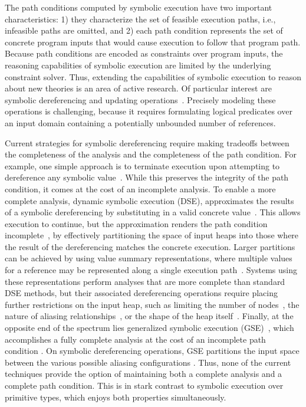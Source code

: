 The path conditions computed by symbolic execution have two important characteristics: 
1) they characterize the set of feasible execution paths, i.e., infeasible paths are omitted, 
and 2) each path condition represents the set of concrete program inputs that would cause
execution to follow that program path. Because path conditions are encoded as constraints over
program inputs, the reasoning capabilities of symbolic execution are limited by the underlying
constraint solver.
Thus, extending the capabilities of symbolic execution to reason about new theories is an area of active research. Of particular interest are symbolic dereferencing and updating operations~\cite{Chen:2013,Qu:2011}. Precisely modeling these operations is challenging, because it requires formulating logical predicates over an input domain containing a potentially unbounded number of references. 

Current strategies for symbolic dereferencing require making tradeoffs between the completeness of the analysis and the completeness of the path condition. For example, one simple approach is to terminate execution upon attempting to dereference any symbolic value~\cite{Clarke:2004}. While this preserves the integrity of the path condition, it comes at the cost of an incomplete analysis. To enable a more complete analysis, dynamic symbolic execution (DSE), approximates the results of a symbolic dereferencing by substituting in a valid concrete value~\cite{Godefroid:POPL07,Godefroid:2005,Sen:2005,Tillmann:2008}. This allows execution to continue, but the approximation renders the path condition incomplete~\cite{Chen:2013,Elkarablieh:2009}, by effectively partitioning the space of input heaps into those where the result of the dereferencing matches the concrete execution. Larger partitions can be achieved by using value summary representations, where multiple values for a reference may be represented along a single execution path~\cite{Dillig:2011,Elkarablieh:2009,Sen:2014,Torlak:2014,Xie:2005,Yorsh:2008}. Systems using these representations perform analyses that are more complete than standard DSE methods, but their associated dereferencing operations require placing further restrictions on the input heap, such as limiting the number of nodes~\cite{Elkarablieh:2009}, the nature of aliasing relationships~\cite{Babic:2007,Xie:2005}, or the shape of the heap itself~\cite{Dillig:2011}. Finally, at the opposite end of the spectrum lies generalized symbolic execution (GSE)~\cite{Cadar:2008,KiasanKunit,GSE03,Rosner:2015}, which accomplishes a fully complete analysis at the cost of an incomplete path condition . On symbolic dereferencing operations, GSE partitions the input space between the various possible aliasing configurations . Thus, none of the current techniques provide the option of maintaining both a complete analysis and a complete path condition. This is in stark contrast to symbolic execution over primitive types, which enjoys both properties simultaneously. 

